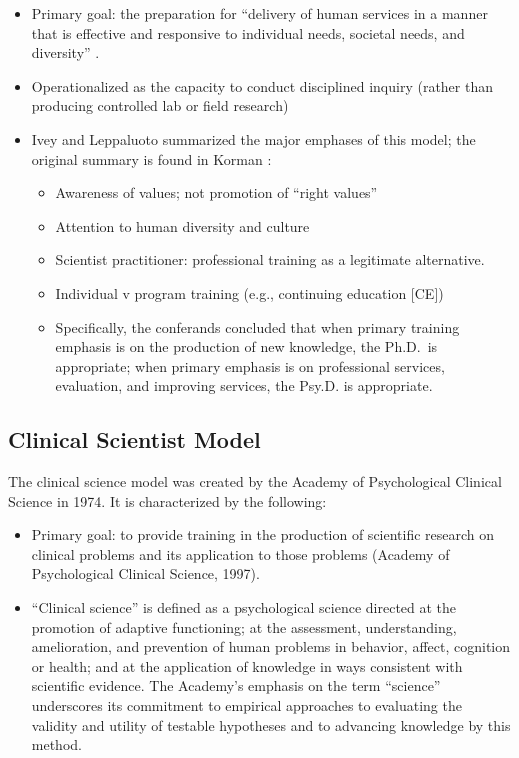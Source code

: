 \documentclass[
  english,
]{book}
\providecommand{\tightlist}{%
  \setlength{\itemsep}{0pt}\setlength{\parskip}{0pt}}
\begin{document}
\begin{itemize}
\tightlist
\item
  Primary goal: the preparation for ``delivery of human services in a manner that is effective and responsive to individual needs, societal needs, and diversity'' \citep[p.~159]{mcholland_national_1992}.
\item
  Operationalized as the capacity to conduct disciplined inquiry (rather than producing controlled lab or field research)
\item
  Ivey and Leppaluoto \citeyearpar{ivey_changes_1975} summarized the major emphases of this model; the original summary is found in Korman \citeyearpar{korman_national_1974}:

  \begin{itemize}
  \tightlist
  \item
    Awareness of values; not promotion of ``right values''
  \item
    Attention to human diversity and culture
  \item
    Scientist practitioner: professional training as a legitimate alternative.
  \item
    Individual v program training (e.g., continuing education {[}CE{]})
  \item
    Specifically, the conferands concluded that when primary training emphasis is on the production of new knowledge, the Ph.D.~is appropriate; when primary emphasis is on professional services, evaluation, and improving services, the Psy.D. is appropriate.
  \end{itemize}
\end{itemize}

\hypertarget{clinical-scientist-model}{%
\subsection{Clinical Scientist Model}\label{clinical-scientist-model}}

The clinical science model was created by the Academy of Psychological Clinical Science in 1974. It is characterized by the following:

\begin{itemize}
\tightlist
\item
  Primary goal: to provide training in the production of scientific research on clinical problems and its application to those problems (Academy of Psychological Clinical Science, 1997).
\item
  ``Clinical science'' is defined as a psychological science directed at the promotion of adaptive functioning; at the assessment, understanding, amelioration, and prevention of human problems in behavior, affect, cognition or health; and at the application of knowledge in ways consistent with scientific evidence. The Academy's emphasis on the term ``science'' underscores its commitment to empirical approaches to evaluating the validity and utility of testable hypotheses and to advancing knowledge by this method.
\end{itemize}
\end{document}
